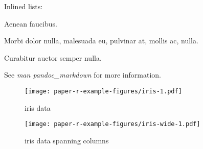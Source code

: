 \documentclass[pagesize,english,DIV=calc,footinclude=false
    ,DIV=14,twocolumn,fontsize=9pt
]{scrartcl}
\begin{document}
Inlined lists: \begin{inparaenum}[(1)] \item Aenean
faucibus. \item Morbi dolor nulla, malesuada eu, pulvinar at, mollis ac,
nulla. \item Curabitur auctor semper nulla. \end{inparaenum}

See \emph{man pandoc\_markdown} for more information.

\begin{figure}
\texttt{[image: paper-r-example-figures/iris-1.pdf]}
\caption{iris data}
\end{figure}

\begin{figure*}
\texttt{[image: paper-r-example-figures/iris-wide-1.pdf]}
\caption{iris data spanning columns}
\end{figure*}

\printbibliography
\end{document}
